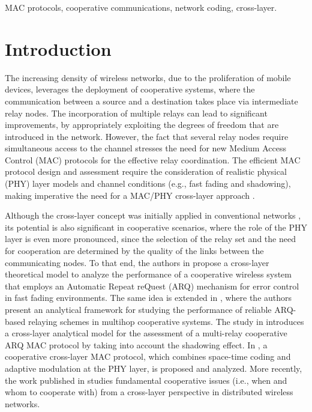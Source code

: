\documentclass[12pt,draftcls, onecolumn]{IEEEtran}
\begin{document}
\begin{IEEEkeywords}
MAC protocols, cooperative communications, network coding, cross-layer.
\end{IEEEkeywords}


\IEEEpeerreviewmaketitle

\section{Introduction}
\label{sec:intro}

The increasing density of wireless networks, due to the proliferation of mobile devices, leverages the deployment of cooperative systems, where the communication between a source and a destination takes place via intermediate relay nodes. The incorporation of multiple relays can lead to significant improvements, by appropriately exploiting the degrees of freedom that are introduced in the network. However, the fact that several relay nodes require simultaneous access to the channel stresses the need for new Medium Access Control (MAC) protocols for the effective relay coordination. The efficient MAC protocol design and assessment require the consideration of realistic physical (PHY) layer models and channel conditions (e.g., fast fading and shadowing), making imperative the need for a MAC/PHY cross-layer approach \cite{cl}.

Although the cross-layer concept was initially applied in conventional networks \cite{cl5,cl1,shad3,cl6}, its potential is also significant in cooperative scenarios, where the role of the PHY layer is even more pronounced, since the selection of the relay set and the need for cooperation are determined by the quality of the links between the communicating nodes. To that end, the authors in \cite{cross} propose a cross-layer theoretical model to analyze the performance of a cooperative wireless system that employs an Automatic Repeat reQuest (ARQ) mechanism for error control in fast fading environments. The same idea is extended in \cite{cl7}, where the authors present an analytical framework for studying the performance of reliable ARQ-based relaying schemes in multihop cooperative systems. The study in \cite{shad4} introduces a cross-layer analytical model for the assessment of a multi-relay cooperative ARQ MAC protocol by taking into account the shadowing effect. In \cite{cl8}, a cooperative cross-layer MAC protocol, which combines space-time coding and adaptive modulation at the PHY layer, is proposed and analyzed. More recently, the work published in \cite{cl2} studies fundamental cooperative issues (i.e., when and whom to cooperate with) from a cross-layer perspective in distributed wireless networks.
\end{document}
